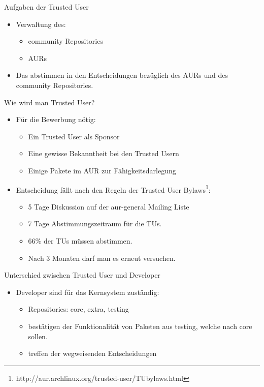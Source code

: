 
\begin{slide}{Aufgaben der Trusted User}
	\begin{itemize}
		\item{Verwaltung des:
			\begin{itemize}
				\item{community Repositories}
				\item{AURs}
			\end{itemize}
		}
		\item{Das abstimmen in den Entscheidungen bez\"{u}glich des AURs und des community Repositories.}
	\end{itemize}
\end{slide}

\begin{slide}{Wie wird man Trusted User?}
	\begin{itemize}
		\item{F\"{u}r die Bewerbung n\"{o}tig:
			\begin{itemize}
				\item{Ein Trusted User als Sponsor}
				\item{Eine gewisse Bekanntheit bei den Trusted Usern}
				\item{Einige Pakete im AUR zur F\"{a}higkeitsdarlegung}
			\end{itemize}
		}
		\item{Entscheidung f\"{a}llt nach den Regeln der Trusted User Bylaws\footnote{http://aur.archlinux.org/trusted-user/TUbylaws.html}:
			\begin{itemize}
				\item{5 Tage Diskussion auf der aur-general Mailing Liste}
				\item{7 Tage Abstimmungszeitraum f\"{u}r die TUs.}
				\item{66\% der TUs m\"{u}ssen abstimmen.}
				\item{Nach 3 Monaten darf man es erneut versuchen.}
			\end{itemize}
		}
	\end{itemize}
\end{slide}

\begin{slide}{Unterschied zwischen Trusted User und Developer}
	\begin{itemize}
		\item{Developer sind f\"{u}r das Kernsystem zust\"{a}ndig:
			\begin{itemize}
				\item{Repositories: core, extra, testing}
				\item{best\"{a}tigen der Funktionalit\"{a}t von Paketen aus testing, welche nach core sollen.}
				\item{treffen der wegweisenden Entscheidungen}
			\end{itemize}
		}
	\end{itemize}
\end{slide}

